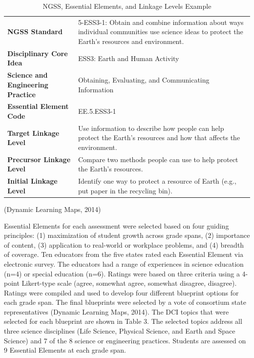 \documentclass[11.5pt]{sig-alternate} %
\begin{document}
\begin{large}
\begin{table}[th]
\caption{NGSS, Essential Elements, and Linkage Levels Example}
\begin{tabular}{ll}
\hline
\textbf{NGSS Standard} & 5-ESS3-1: Obtain and combine information about ways individual communities use science ideas to protect the Earth's resources and environment. \\
\textbf{Disciplinary Core Idea} & ESS3: Earth and Human Activity \\
\textbf{Science and Engineering Practice} & Obtaining, Evaluating, and Communicating Information \\
\textbf{Essential Element Code} & EE.5.ESS3-1 \\
\textbf{Target Linkage Level} & Use information to describe how people can help protect the Earth's resources and how that affects the environment. \\
\textbf{Precursor Linkage Level} & Compare two methods people can use to help protect the Earth's resources. \\
\textbf{Initial Linkage Level} & Identify one way to protect a resource of Earth (e.g., put paper in the recycling bin). \\ \hline
\end{tabular}
(Dynamic Learning Maps, 2014)
\end{table}

Essential Elements for each assessment were selected based on four guiding principles: (1) maximization of student growth across grade spans, (2) importance of content, (3) application to real-world or workplace problems, and (4) breadth of coverage. Ten educators from the five states rated each Essential Element via electronic survey. The educators had a range of experiences in science education (n=4) or special education (n=6). Ratings were based on three criteria using a 4-point Likert-type scale (agree, somewhat agree, somewhat disagree, disagree). Ratings were compiled and used to develop four different blueprint options for each grade span. The final blueprints were selected by a vote of consortium state representatives (Dynamic Learning Maps, 2014). The DCI topics that were selected for each blueprint are shown in Table 3. The selected topics address all three science disciplines (Life Science, Physical Science, and Earth and Space Science) and 7 of the 8 science or engineering practices. Students are assessed on 9 Essential Elements at each grade span.


\end{large}
\end{document}
